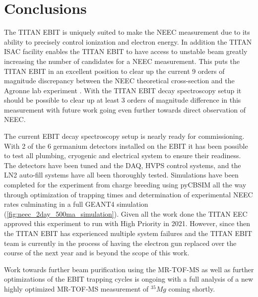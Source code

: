 \documentclass[jon_ringuette_thesis_proposal.tex]{subfiles}
\begin{document}
    \chapter{Conclusions}
    The TITAN EBIT is uniquely suited to make the NEEC measurement due to its ability to precisely control ionization and electron energy.
    In addition the TITAN ISAC facility enables the TITAN EBIT to have access to unstable beam greatly increasing the number of candidates for a NEEC measurement.
    This puts the TITAN EBIT in an excellent position to clear up the current 9 orders of magnitude discrepancy between the NEEC theoretical cross-section \cite{Wu2019} and the Agronne lab experiment \cite{Chiara2018}.
    With the TITAN EBIT decay spectroscopy setup it should be possible to clear up at least 3 orders of magnitude difference in this measurement with future work going even further towards direct observation of NEEC.

    The current EBIT decay spectroscopy setup is nearly ready for commissioning.
    With 2 of the 6 germanium detectors installed on the EBIT it has been possible to test all plumbing, cryogenic and electrical system to ensure their readiness.
    The detectors have been tuned and the DAQ, HVPS control systems, and the LN2 auto-fill systems have all been thoroughly tested.
    Simulations have been completed for the experiment from charge breeding using pyCBSIM all the way through optimization of trapping times and determination of experimental NEEC rates culminating in a full GEANT4 simulation (\ref{fig:neec_2day_500ma_simulation}).
    Given all the work done the TITAN EEC approved this experiment to run with High Priority in 2021.
    However, since then the TITAN EBIT has experienced multiple system failures and the TITAN EBIT team is currently in the process of having the electron gun replaced over the course of the next year and is beyond the scope of this work.

    Work towards further beam purification using the MR-TOF-MS as well as further optimizations of the EBIT trapping cycles is ongoing with a full analysis of a new highly optimized MR-TOF-MS measurement of $^{35}Mg$ coming shortly.
\end{document}
